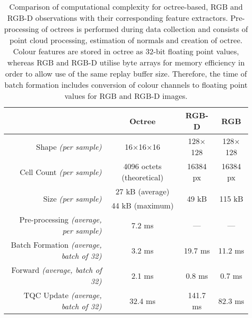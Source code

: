 \begin{table}[ht]
    \centering
    \begin{tabular}{r|ccc}
                                                        &
        \textbf{Octree}                                 & \textbf{RGB-D}             & \textbf{RGB}                                     \\ \hline
        Shape \textit{(per sample)}                     & 16\(\times\)16\(\times\)16 & 128\(\times\)128       & 128\(\times\)128        \\
        Cell Count \textit{(per sample)}                & 4096 octets (theoretical)  & 16384 px               & 16384 px                \\
        \multirow{2}{*}{Size \textit{(per sample)}}     & 27 kB (average)            & \multirow{2}{*}{49 kB} & \multirow{2}{*}{115 kB} \\
                                                        & 44 kB (maximum)            &                        &                         \\ \hline
        Pre-processing \textit{(average, per sample)}   & 7.2 ms                     & ---                    & ---                     \\
        Batch Formation \textit{(average, batch of 32)} & 3.2 ms                     & 19.7 ms                & 11.2 ms                 \\
        Forward \textit{(average, batch of 32)}         & 2.1 ms                     & 0.8 ms                 & 0.7 ms                  \\
        TQC Update \textit{(average, batch of 32)}      & 32.4 ms                    & 141.7 ms               & 82.3 ms
    \end{tabular}
    \caption{Comparison of computational complexity for octree-based, RGB and RGB-D observations with their corresponding feature extractors. Pre-processing of octrees is performed during data collection and consists of point cloud processing, estimation of normals and creation of octree. Colour features are stored in octree as 32-bit floating point values, whereas RGB and RGB-D utilise byte arrays for memory efficiency in order to allow use of the same replay buffer size. Therefore, the time of batch formation includes conversion of colour channels to floating point values for RGB and RGB-D images.}
    \label{tab:feature_extractor_memory_and_computational_time}
\end{table}

\newpage


